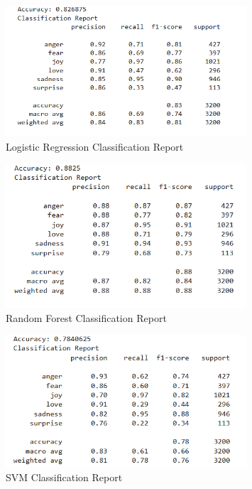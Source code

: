 \begin{figure}[h!]
	\centering
	\includegraphics[width=0.8\textwidth]{images/init_result_logistic_regression.png}
	\caption{Logistic Regression Classification Report}
	\label{fig:initial_logistic_regression}
\end{figure}

\begin{figure}[h!]
	\centering
	\includegraphics[width=0.8\textwidth]{images/init_result_random_forest.png}
	\caption{Random Forest Classification Report}
	\label{fig:initial_random_forest}
\end{figure}

\begin{figure}[h!]
	\centering
	\includegraphics[width=0.8\textwidth]{images/init_result_svm.png}
	\caption{SVM Classification Report}
	\label{fig:initial_svm}
\end{figure}

